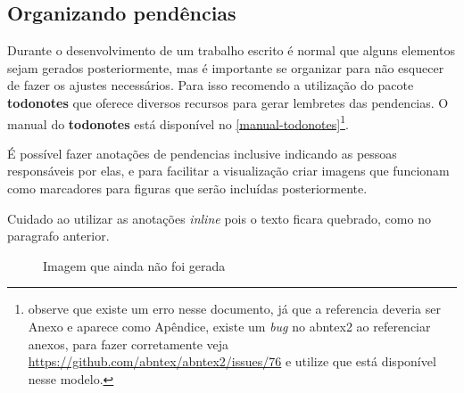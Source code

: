 \subsection{Organizando pendências}

Durante o desenvolvimento de um trabalho escrito é normal que alguns elementos sejam gerados posteriormente, mas é importante se organizar para não esquecer de fazer os ajustes necessários. Para isso recomendo a utilização do pacote \textbf{todonotes} que oferece diversos recursos para gerar lembretes das pendencias. O manual do \textbf{todonotes} está disponível no \autoref{manual-todonotes}\footnote{observe que existe um erro nesse documento, já que a referencia deveria ser Anexo e aparece como Apêndice,  existe um \textit{bug} no abntex2 ao referenciar anexos, para fazer corretamente veja \url{https://github.com/abntex/abntex2/issues/76} e utilize  que está disponível nesse modelo.}.

É possível fazer anotações de pendencias inclusive indicando as pessoas responsáveis por elas, %
 e para facilitar a visualização criar imagens que funcionam como marcadores para figuras que serão incluídas posteriormente.

Cuidado ao utilizar as anotações \textit{inline} pois o texto ficara quebrado, como no paragrafo anterior.


\begin{figure}[htb]
    \centering
	\caption{\label{fig_todo1}Imagem que ainda não foi gerada}
\end{figure}


